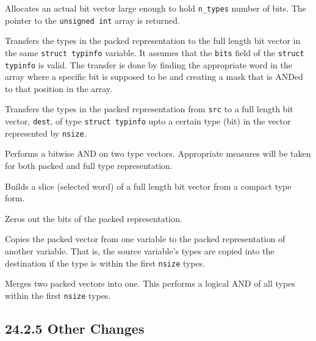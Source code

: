Allocates an actual bit vector large enough to hold \texttt{n\_types}
number of bits. The pointer to the \texttt{unsigned int} array is
returned.


Transfers the types in the packed representation to the full length
bit vector in the same \texttt{struct typinfo} variable. It assumes
that the \texttt{bits} field of the \texttt{struct typinfo} is
valid. The transfer is done by finding the appropriate word in the
array where a specific bit is supposed to be and creating a mask that
is ANDed to that position in the array.


Transfers the types in the packed representation from \texttt{src} to
a full length bit vector, \texttt{dest}, of type \texttt{struct
typinfo} upto a certain type (bit) in the vector represented by
\texttt{nsize}.


Performs a bitwise AND on two type vectors. Appropriate measures
will be taken for both packed and full type representation.


Builds a slice (selected word) of a full length bit vector from a
compact type form.


Zeros out the bits of the packed representation.


Copies the packed vector from one variable to the packed
representation of another variable. That is, the source variable's
types are copied into the destination if the type is within the first
\texttt{nsize} types.


Merges two packed vectors into one. This performs a logical AND of
all types within the first \texttt{nsize} types.

\subsection[24.2.5 Other Changes]{24.2.5 Other Changes}

